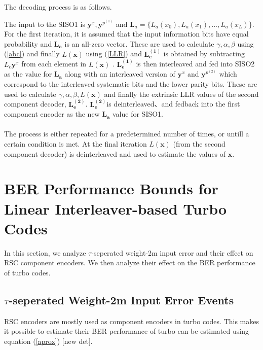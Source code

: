 \documentclass[20 pts]{article}
\begin{document}
    
  The decoding process is as follows.
  

The input to the SISO1 is $\mathbf{y}^x,\mathbf{y}^{p^{(1)}}$ 
and $\mathbf{L}_a=\{L_a(x_0),L_a(x_1),...,L_a(x_{L})\}$. 
For the first iteration, it is assumed 
that the input information bits have equal probability and $\mathbf{L_a}$ is an 
all-zero vector.
These are used to calculate $\gamma ,\alpha , \beta$ using (\ref{abc})
 and finally
$ L(\mathbf{x})$ using (\ref{LLR}) and $\mathbf{L_e^{(1)}}$ is obtained by subtracting
 $L_c\mathbf{y}^x$  from each element in $ L(\mathbf{x})$ .
$\mathbf{L_e^{(1)}}$ is then
 interleaved and fed into SISO2 as the value for
 $\mathbf{L_a}$ along with an interleaved version of $\mathbf{y}^{x}$ and 
 $ \mathbf{y}^{p^{(2)}}$ which correspond to
 the interleaved systematic bits and the lower parity bits. These are used to calculate 
 $\gamma,\alpha , 
\beta, L(\mathbf{x})$
 and finally the extrinsic LLR values 
of the second component decoder, $\mathbf{L_e^{(2)}}$.
$\mathbf{L_e^{(2)}}$is deinterleaved、and fedback into the first component encoder
 as the new $\mathbf{L_a}$ value for SISO1.
\paragraph{}
The process is either repeated for a predetermined number of times, or untill a certain 
condition is met. At the final iteration $ L(\mathbf{x})$ (from the second component
 decoder) is deinterleaved and used to estimate the values of $\mathbf{x}$.

\section{BER Performance Bounds for Linear Interleaver-based Turbo Codes}
In this section, we analyze $\tau$-seperated weight-2m input error and their effect on 
RSC component encoders. We then analyze their effect on the BER performance of
turbo codes.

\subsection{$\tau$-seperated Weight-2m Input Error Events}
RSC encoders are mostly used as component encoders in turbo codes. This makes it
possible to estimate their BER performance of turbo can be estimated 
using equation (\ref{aprox}) [new det].
\end{document}
